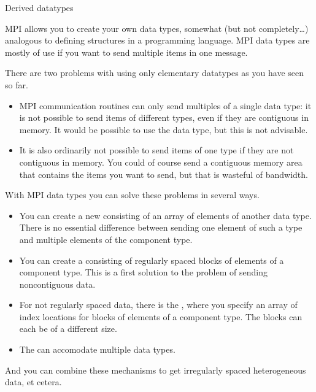 
 {Derived datatypes}
\label{sec:derived-types}

MPI allows you to create your own data types, somewhat (but not completely\ldots)
analogous to defining
structures in a programming language. MPI data types are mostly of use
if you want to send multiple items in one message.

There are two problems with using only elementary datatypes
as you have seen so far.
\begin{itemize}
\item MPI communication routines can only send multiples of a
  single data type: it is not possible to send items of different
  types, even if they are contiguous in memory. It would be possible
  to use the  data type, but this is not advisable.
\item It is also ordinarily not possible to send items of one type if they are
  not contiguous in memory. You could of course send a contiguous memory area
  that contains the items you want to send, but that is wasteful of
  bandwidth.
\end{itemize}
With MPI data types you can solve these problems in several ways.
\begin{itemize}
\item You can create a new 
  consisting of an array of elements of another data type. There is no
  essential difference between sending one element of such a type
  and multiple elements of the
  component type.
\item You can create a  consisting of
  regularly spaced blocks of elements of a component type. This is a first
  solution to the problem of sending noncontiguous data.
\item For not regularly spaced data, there is the
  , where you specify an array of
  index locations for blocks of elements of a component type.
  The blocks can each be of a different size.
\item The  can accomodate multiple
  data types.
\end{itemize}
And you can combine these mechanisms to get irregularly spaced
heterogeneous data, et cetera.

